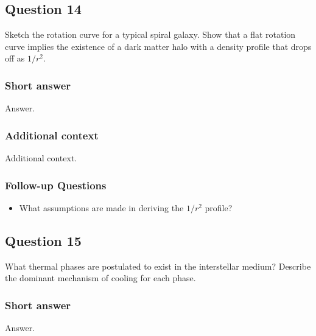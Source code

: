 \documentclass[a4paper,10pt]{article}
\begin{document}

\newpage
\subsection{Question 14}

Sketch the rotation curve for a typical spiral galaxy. Show that a flat rotation curve implies the existence of a dark matter halo with a density profile that drops off as $1/r^2$.

\subsubsection{Short answer}

Answer.

\subsubsection{Additional context}

Additional context.

\subsubsection{Follow-up Questions}

\begin{itemize}
    \item What assumptions are made in deriving the $1/r^2$ profile?
\end{itemize}


\newpage
\subsection{Question 15}

What thermal phases are postulated to exist in the interstellar medium? Describe the dominant mechanism of cooling for each phase.

\subsubsection{Short answer}

Answer.
\end{document}
